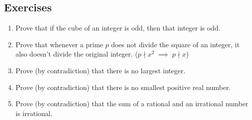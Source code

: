 \documentclass[10pt,]{book}
\theoremstyle{plain}
\theoremstyle{definition}
\theoremstyle{definition}
\numberwithin{equation}{section}
\newcommand{\hint}[1]{ }
\newcommand{\divides}{\!\mid\!}
\newcommand{\Integers}{{\mathbb Z}}
\begin{document}
\subsection[{Exercises}]{Exercises}\label{exercises-17}
\leavevmode%
\begin{enumerate}[label=(\alph*)]
\item\hypertarget{li-253}{}
          Prove that if the cube of an integer is odd, then that integer is odd.

          \hint{The best hint for this problem is simply to write down the contrapositive statement. It is trivial to prove!}
\item\hypertarget{li-254}{}
          Prove that whenever a prime \(p\) does not divide the square of an integer, 
          it also doesn't divide the original integer. 
          (\(p \nmid x^2 \; \implies \; p \nmid x\))

          \hint{The contrapositive is \((p \divides x) \; \implies \; (p \divides x^2)\).}
\item\hypertarget{li-255}{}
        Prove (by contradiction) that there is no largest integer.

        \hint{Well, if there was a largest integer \textemdash{} let's call it \(L\) (for largest) \textemdash{} then isn't \(L+1\) an integer, and isn't it bigger?  That's the main idea.  A more formal proof might look like this:

        \begin{proof}\hypertarget{proof-15}{}

            Suppose (by way of contradiction) that there is a largest integer \(L\). Then \(L \in \Integers\) and \(\forall z \in \Integers, L \geq z\).
            Consider the quantity \(L+1\). Clearly \(L+1\) is an integer (because it is the sum of two integers) and also
            \(L+1 > L\). This is a contradiction so the original supposition is false. Hence there is no largest integer.
\end{proof}


        }
\item\hypertarget{li-256}{}
          Prove (by contradiction) that there is no smallest positive real number.

          \hint{Assume there was a smallest positive real number \textemdash{} might as well call it \(s\) (for smallest) \textemdash{} what can we do to produce an even smaller number? (But be careful that it needs to remain positive \textemdash{} for instance \(s-1\) won't work.)}
\item\hypertarget{li-257}{}
          Prove (by contradiction) that the sum of a rational and an irrational 
          number is irrational.


\end{enumerate}
\end{document}
